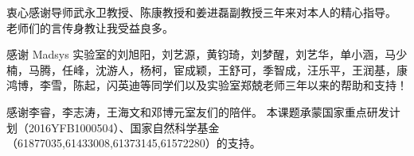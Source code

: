 
\begin{acknowledgements}
  衷心感谢导师武永卫教授、陈康教授和姜进磊副教授三年来对本人的精心指导。
  老师们的言传身教让我受益良多。

  感谢 Madsys 实验室的刘旭阳，刘艺源，黄钧琦，刘梦醒，刘艺华，单小涵，马少楠，马腾，任峰，沈游人，杨柯，宦成颖，王舒可，季智成，汪乐平，王润基，康鸿博，李雪，陈起，闪英迪等同学们以及实验室郑兢老师三年以来的帮助和支持！

  感谢李睿，李志涛，王海文和邓博元室友们的陪伴。
  本课题承蒙国家重点研发计划（2016YFB1000504）、国家自然科学基金（61877035,61433008,61373145,61572280）的支持。
\end{acknowledgements}
